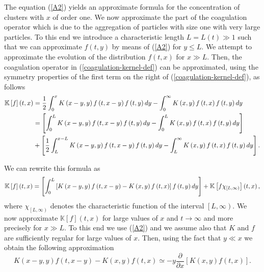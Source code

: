 \documentclass[11pt]{article}
\numberwithin{equation}{section}
\theoremstyle{plain}
\newcommand{\der}{\textup{d}}
\begin{document}
The equation (\ref{A2}) yields an approximate formula for the concentration of
clusters with $x$ of order one. We now approximate the part of the coagulation
operator which is due to the aggregation of particles with size one with very
large particles. To this end we introduce a characteristic length $L=L\left(
t\right)  \gg1$ such that we can approximate $f\left(  t,y\right)  $ by means
of (\ref{A2}) for $y\leq L.$ We attempt to approximate the evolution of
the distribution $f\left(  t,x\right)  $ for $x\gg L.$
Then, the coagulation
operator in (\ref{coagulation-kernel-def}) can be approximated, using the symmetry
properties of the first term on the right of (\ref{coagulation-kernel-def}), as follows%
\begin{align*}
\mathbb{K}\left[  f\right]  \left(  t,x\right)    & =\frac{1}{2}\int_{0}%
^{x}K\left(  x-y,y\right)  f\left(  t,x-y\right)  f\left(  t,y\right)
\der y-\int_{0}^{\infty}K\left(  x,y\right)  f\left(  t,x\right)  f\left(
t,y\right)  \der y\\
& =\left[ \int_{0}^{L}K\left(  x-y,y\right)  f\left(  t,x-y\right)  f\left(
t,y\right)  \der y-\int_{0}^{L}K\left(  x,y\right)  f\left(  t,x\right)  f\left(
t,y\right)  \der y\right]  \\
& +\left[  \frac{1}{2}\int_{L}^{x-L}K\left(  x-y,y\right)  f\left(
t,x-y\right)  f\left(  t,y\right)  \der y-\int_{L}^{\infty}K\left(  x,y\right)
f\left(  t,x\right)  f\left(  t,y\right)  \der y\right].
\end{align*}


We can rewrite this formula as%
\begin{equation}
\mathbb{K}\left[  f\right]  \left(  t,x\right)  =\left[  \int_{0}^{L}\left[
K\left(  x-y,y\right)  f\left(  t,x-y\right)  -K\left(  x,y\right)  f\left(
t,x\right)  \right]  f\left(  t,y\right)  \der y\right]  +\mathbb{K}\left[
f\chi_{\left[  L,\infty\right)  }\right]  \left(  t,x\right),  \label{A3}%
\end{equation}
where $\chi_{\left[  L,\infty\right)  }$ denotes the characteristic function
of the interval $\left[  L,\infty\right)  .$ We now approximate $\mathbb{K}%
\left[  f\right]  \left(  t,x\right)  $ for large values of $x$ and
$t\rightarrow\infty$ and more precisely for $x\gg L.$ To this end we use
(\ref{A2}) and we assume also that $K$ and $f$ are sufficiently regular for
large values of $x.$ Then, using the fact that $y\ll x$ we obtain the
following approximation%
\begin{equation}
K\left(  x-y,y\right)  f\left(  t,x-y\right)  -K\left(  x,y\right)  f\left(
t,x\right)  \simeq-y\frac{\partial}{\partial x}\left[  K\left(  x,y\right)
f\left(  t,x\right)  \right].  \label{A4}%
\end{equation}
\end{document}
